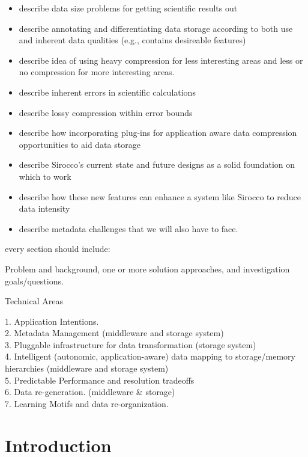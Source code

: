 

\begin{itemize}

\item describe data size problems for getting scientific results out
\item describe annotating and differentiating data storage according to both
use and inherent data qualities (e.g., contains desireable features)
\item describe idea of using heavy compression for less interesting areas and less or no compression for more interesting areas.
\item describe inherent errors in scientific calculations
\item describe lossy compression within error bounds
\item describe how incorporating plug-ins for application aware data compression opportunities to aid data storage
\item describe Sirocco's current state and future designs as a solid foundation on which to work
\item describe how these new features can enhance a system like Sirocco to reduce data intensity
\item describe metadata challenges that we will also have to face.

\end{itemize}

every section should include:

Problem and background, one or more solution approaches, and investigation goals/questions.

Technical Areas
 
1. Application Intentions.\\
2. Metadata Management (middleware and storage system)\\
3. Pluggable infrastructure for data transformation (storage system)\\
4. Intelligent (autonomic, application-aware) data mapping to storage/memory hierarchies (middleware and storage system)\\
5. Predictable Performance and resolution tradeoffs\\
6. Data re-generation. (middleware \& storage)\\
7. Learning Motifs and data re-organization.\\

\section*{Introduction}

